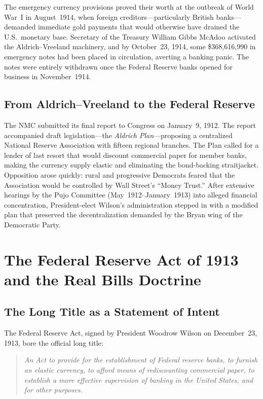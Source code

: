 \documentclass[12pt]{article}
\begin{document}
The emergency currency provisions proved their worth at the outbreak of World War~I
in August~1914, when foreign creditors---particularly British banks---demanded
immediate gold payments that would otherwise have drained the U.S.\ monetary base.
Secretary of the Treasury William Gibbs McAdoo activated the Aldrich--Vreeland
machinery, and by October~23, 1914, some \$368{,}616{,}990 in emergency notes had
been placed in circulation, averting a banking panic.  The notes were entirely
withdrawn once the Federal Reserve banks opened for business in November~1914.

\subsection{From Aldrich--Vreeland to the Federal Reserve}

The NMC submitted its final report to Congress on January~9, 1912.  The report
accompanied draft legislation---the \emph{Aldrich Plan}---proposing a
centralized National Reserve Association with fifteen regional branches.  The Plan
called for a lender of last resort that would discount commercial paper for member
banks, making the currency supply elastic and eliminating the bond-backing
straitjacket.  Opposition arose quickly: rural and progressive Democrats feared
that the Association would be controlled by Wall Street's ``Money Trust.''  After
extensive hearings by the Pujo Committee (May~1912--January~1913) into alleged
financial concentration, President-elect Wilson's administration stepped in with
a modified plan that preserved the decentralization demanded by the Bryan wing of
the Democratic Party.

\section{The Federal Reserve Act of 1913 and the Real Bills Doctrine}
\label{sec:federal-reserve}

\subsection{The Long Title as a Statement of Intent}

The Federal Reserve Act, signed by President Woodrow Wilson on December~23, 1913,
bore the official long title:
\begin{quote}
\emph{An Act to provide for the establishment of Federal reserve banks, to furnish
an elastic currency, to afford means of rediscounting commercial paper, to
establish a more effective supervision of banking in the United States, and for
other purposes.}
\end{quote}
\end{document}
